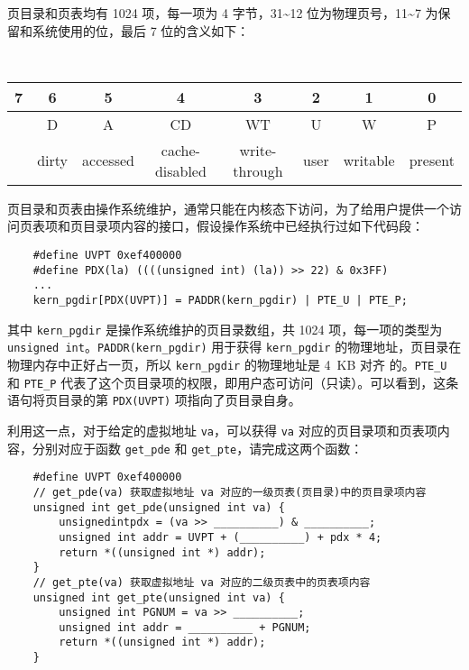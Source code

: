 \begin{problems}
        页目录和页表均有 1024 项，每一项为 4 字节，31\textasciitilde 12 位为物理页号，11\textasciitilde 7 为保留和系统使用的位，最后 7 位的含义如下：
        \begin{table}[H]
            \tt
            \centering
            \begin{tabular}{cccccccc}
                {\footnotesize 7} & {\footnotesize 6} & {\footnotesize 5} & {\footnotesize 4} & {\footnotesize 3} & {\footnotesize 2} & {\footnotesize 1} & {\footnotesize 0} \\ \hline
                \multicolumn{1}{|c|}{\cellcolor{gray!50}} & \multicolumn{1}{c|}{D} & \multicolumn{1}{c|}{A} & \multicolumn{1}{c|}{CD} & \multicolumn{1}{c|}{WT} & \multicolumn{1}{c|}{U} & \multicolumn{1}{c|}{W} & \multicolumn{1}{c|}{P} \\ \hline
                & {\footnotesize dirty} & {\footnotesize accessed} & {\footnotesize cache-disabled} & {\footnotesize write-through} & {\footnotesize user} & {\footnotesize writable} & {\footnotesize present}
            \end{tabular}
        \end{table}

        页目录和页表由操作系统维护，通常只能在内核态下访问，为了给用户提供一个访问页表项和页目录项内容的接口，假设操作系统中已经执行过如下代码段：
        \begin{verbatim}
    #define UVPT 0xef400000
    #define PDX(la) ((((unsigned int) (la)) >> 22) & 0x3FF)
    ...
    kern_pgdir[PDX(UVPT)] = PADDR(kern_pgdir) | PTE_U | PTE_P;
        \end{verbatim}
        其中 \verb|kern_pgdir| 是操作系统维护的页目录数组，共 1024 项，每一项的类型为 \verb|unsigned int|。\verb|PADDR(kern_pgdir)| 用于获得 \verb|kern_pgdir| 的物理地址，页目录在物理内存中正好占一页，所以 \verb|kern_pgdir| 的物理地址是 \SI{4}{KB} 对齐 的。\verb|PTE_U| 和 \verb|PTE_P| 代表了这个页目录项的权限，即用户态可访问（只读）。可以看到，这条语句将页目录的第 \verb|PDX(UVPT)| 项指向了页目录自身。
        
        利用这一点，对于给定的虚拟地址 \verb|va|，可以获得 \verb|va| 对应的页目录项和页表项内容，分别对应于函数 \verb|get_pde| 和 \verb|get_pte|，请完成这两个函数：
        \begin{verbatim}
    #define UVPT 0xef400000
    // get_pde(va) 获取虚拟地址 va 对应的一级页表(页目录)中的页目录项内容
    unsigned int get_pde(unsigned int va) {
        unsignedintpdx = (va >> __________) & __________;
        unsigned int addr = UVPT + (__________) + pdx * 4;
        return *((unsigned int *) addr);
    }
    // get_pte(va) 获取虚拟地址 va 对应的二级页表中的页表项内容
    unsigned int get_pte(unsigned int va) {
        unsigned int PGNUM = va >> __________;
        unsigned int addr = __________ + PGNUM;
        return *((unsigned int *) addr);
    }
        \end{verbatim}
    \end{problems}